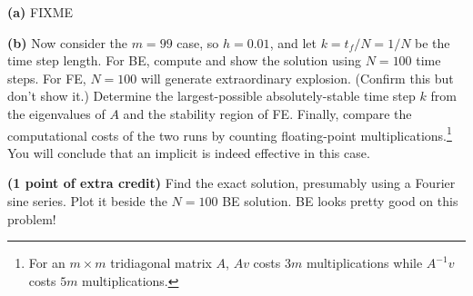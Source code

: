 \documentclass[12pt]{amsart}
\newcommand{\epart}[1]{\medskip\noindent\textbf{(#1)}\quad }
\begin{document}
\epart{a}  FIXME

\epart{b}  Now consider the $m=99$ case, so $h=0.01$, and let $k=t_f/N=1/N$ be the time step length.  For BE, compute and show the solution using $N=100$ time steps.  For FE, $N=100$ will generate extraordinary explosion.  (Confirm this but don't show it.)  Determine the largest-possible absolutely-stable time step $k$ from the eigenvalues of $A$ and the stability region of FE.  Finally, compare the computational costs of the two runs by counting floating-point multiplications.\footnote{For an $m\times m$ tridiagonal matrix $A$, $A v$ costs $3m$ multiplications while $A^{-1} v$ costs $5m$ multiplications.}  You will conclude that an implicit is indeed effective in this case.

\epart{1 point of extra credit}  Find the exact solution, presumably using a Fourier sine series.  Plot it beside the $N=100$ BE solution.  BE looks pretty good on this problem!
\end{document}
